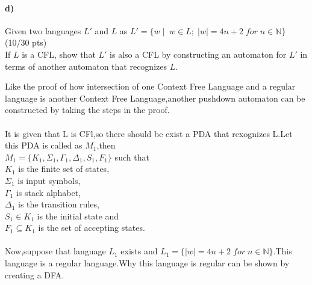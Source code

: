 \documentclass[a4paper,12pt]{article}
\begin{document}
\paragraph{d)} Given two languages $L'$ and $L$ as $L'=\{w \mid \; w\in L; \; |w|=4n+2 \; for\; n\in \mathbb{N} \}$
\hfill \small{(10/30 pts)} \\
If $L$ is a CFL, show that $L'$ is also a CFL by constructing an automaton for $L'$ in terms of another automaton that recognizes $L$. \\


\begin{tcolorbox}

Like the proof of how intersection of one Context Free Language and a regular language is another Context Free Language,another pushdown automaton can be constructed by taking the steps in the proof.\\\\
It is given that L is CFl,so there should be exist a PDA that rexognizes L.Let this PDA is called as $M_1$,then \\
$M_1=\{K_1,\Sigma_1,\Gamma_1,\Delta_1,S_1,F_1\}$  such that \\
$K_1$ is the finite set of states,\\
$\Sigma_1$ is input symbols,\\
$\Gamma_1$ is stack alphabet,\\
$\Delta_1$ is the transition rules,\\
$S_1 \in K_1$ is the initial state and\\
$F_1\subseteq K_1$ is the set of accepting states.\\\\
Now,suppose that language $L_1$ exists and $L_1=\{|w|=4n+2 \; for\; n\in \mathbb{N} \}$.This language is a regular language.Why this language is regular can be shown by creating a DFA.\\\\

\begin{center}
\end{center}


\end{tcolorbox}
\end{document}
